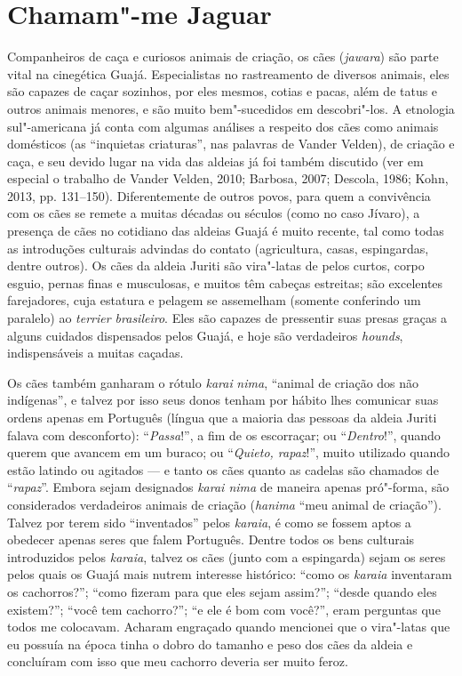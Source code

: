 \section{Chamam"-me Jaguar}\label{chamam-me-jaguar}

Companheiros de caça e curiosos animais de criação, os cães
(\emph{jawara}) são parte vital na cinegética Guajá. Especialistas no
rastreamento de diversos animais, eles são capazes de caçar sozinhos,
por eles mesmos, cotias e pacas, além de tatus e outros animais menores,
e são muito bem"-sucedidos em descobri"-los. A etnologia sul"-americana já
conta com algumas análises a respeito dos cães como animais domésticos
(as ``inquietas criaturas'', nas palavras de Vander Velden), de criação e
caça, e seu devido lugar na vida das aldeias já foi também discutido
(ver em especial o trabalho de Vander Velden, 2010; Barbosa, 2007;
Descola, 1986; Kohn, 2013, pp. 131--150). Diferentemente de outros povos,
para quem a convivência com os cães se remete a muitas décadas ou
séculos (como no caso Jívaro), a presença de cães no cotidiano das
aldeias Guajá é muito recente, tal como todas as introduções culturais
advindas do contato (agricultura, casas, espingardas, dentre outros). Os
cães da aldeia Juriti são vira"-latas de pelos curtos, corpo esguio,
pernas finas e musculosas, e muitos têm cabeças estreitas; são
excelentes farejadores, cuja estatura e pelagem se assemelham (somente
conferindo um paralelo) ao \emph{terrier brasileiro}. Eles são capazes
de pressentir suas presas graças a alguns cuidados dispensados pelos
Guajá, e hoje são verdadeiros \emph{hounds}, indispensáveis a muitas
caçadas.

Os cães também ganharam o rótulo \emph{karai} \emph{nima}, ``animal de
criação dos não indígenas'', e talvez por isso seus donos tenham por
hábito lhes comunicar suas ordens apenas em Português (língua que a
maioria das pessoas da aldeia Juriti falava com desconforto):
``\emph{Passa}!'', a fim de os escorraçar; ou ``\emph{Dentro}!'', quando
querem que avancem em um buraco; ou ``\emph{Quieto, rapaz}!'', muito
utilizado quando estão latindo ou agitados --- e tanto os cães quanto as
cadelas são chamados de ``\emph{rapaz}''. Embora sejam designados
\emph{karai nima} de maneira apenas pró"-forma, são considerados
verdadeiros animais de criação (\emph{hanima} ``meu animal de
criação''). Talvez por terem sido ``inventados'' pelos \emph{karaia}, é
como se fossem aptos a obedecer apenas seres que falem Português. Dentre
todos os bens culturais introduzidos pelos \emph{karaia}, talvez os cães
(junto com a espingarda) sejam os seres pelos quais os Guajá mais nutrem
interesse histórico: ``como os \emph{karaia} inventaram os cachorros?'';
``como fizeram para que eles sejam assim?''; ``desde quando eles existem?'';
``você tem cachorro?''; ``e ele é bom com você?'', eram perguntas que todos
me colocavam. Acharam engraçado quando mencionei que o vira"-latas que eu
possuía na época tinha o dobro do tamanho e peso dos cães da aldeia e
concluíram com isso que meu cachorro deveria ser muito feroz.

